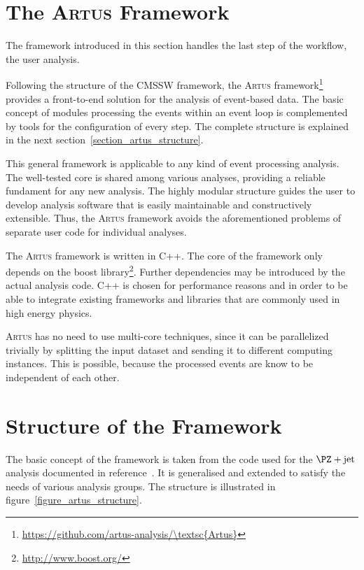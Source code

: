 \documentclass[3p]{elsarticle}
\newcommand{\software}[1]{\textsc{#1}\xspace}
\newcommand{\artus}{\software{Artus}}
\begin{document}
\section{The \artus Framework \label{section_artus_motivation}}

The framework introduced in this section handles the last step of the workflow, the user analysis.

Following the structure of the CMSSW  framework, the \artus framework\footnote{\url{https://github.com/artus-analysis/\artus}} provides a front-to-end solution for the analysis of event-based data.
The basic concept of modules processing the events within an event loop is complemented by tools for the configuration of every step.
The complete structure is explained in the next section~\ref{section_artus_structure}.

This general framework is applicable to any kind of event processing analysis.
The well-tested core is shared among various analyses, providing a reliable fundament for any new analysis.
The highly modular structure guides the user to develop analysis software that is easily maintainable and constructively extensible.
Thus, the \artus framework avoids the aforementioned problems of separate user code for individual analyses.

The \artus framework is written in C++.
The core of the framework only depends on the boost library\footnote{\url{http://www.boost.org/}}.
Further dependencies may be introduced by the actual analysis code.
C++ is chosen for performance reasons and in order to be able to integrate existing frameworks and libraries that are commonly used in high energy physics.

\artus has no need to use multi-core techniques, since it can be parallelized trivially by splitting the input dataset and sending it to different computing instances.
This is possible, because the processed events are know to be independent of each other.

\section{Structure of the Framework \label{section_artus_structure}}

The basic concept of the framework is taken from the code used for the $\PZ+\text{jet}$ analysis documented in reference~\cite{joram_phd}.
It is generalised and extended to satisfy the needs of various analysis groups.
The structure is illustrated in figure~\ref{figure_artus_structure}.
\end{document}
